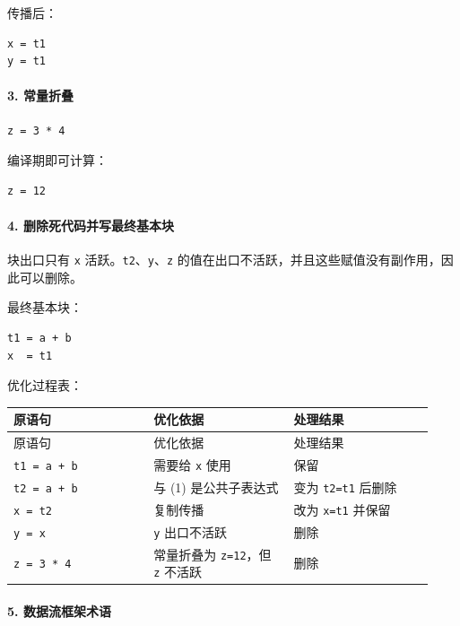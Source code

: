\documentclass[UTF8]{ctexart}
\begin{document}
传播后：

\begin{Verbatim}[fontsize=\small,breaklines=true]
x = t1
y = t1
\end{Verbatim}

\paragraph*{3. 常量折叠}

\begin{Verbatim}[fontsize=\small,breaklines=true]
z = 3 * 4
\end{Verbatim}

编译期即可计算：

\begin{Verbatim}[fontsize=\small,breaklines=true]
z = 12
\end{Verbatim}

\paragraph*{4. 删除死代码并写最终基本块}

块出口只有 \texttt{x} 活跃。\texttt{t2}、\texttt{y}、\texttt{z} 的值在出口不活跃，并且这些赋值没有副作用，因此可以删除。

最终基本块：

\begin{Verbatim}[fontsize=\small,breaklines=true]
t1 = a + b
x  = t1
\end{Verbatim}

优化过程表：

\begin{longtable}{|p{0.31\linewidth}|p{0.31\linewidth}|p{0.31\linewidth}|}
\hline
原语句 & 优化依据 & 处理结果 \\
\hline
\endfirsthead
原语句 & 优化依据 & 处理结果 \\
\hline
\endhead
\texttt{t1 = a + b} & 需要给 \texttt{x} 使用 & 保留 \\
\hline
\texttt{t2 = a + b} & 与 (1) 是公共子表达式 & 变为 \texttt{t2=t1} 后删除 \\
\hline
\texttt{x = t2} & 复制传播 & 改为 \texttt{x=t1} 并保留 \\
\hline
\texttt{y = x} & \texttt{y} 出口不活跃 & 删除 \\
\hline
\texttt{z = 3 * 4} & 常量折叠为 \texttt{z=12}，但 \texttt{z} 不活跃 & 删除 \\
\hline
\end{longtable}

\paragraph*{5. 数据流框架术语}
\end{document}
